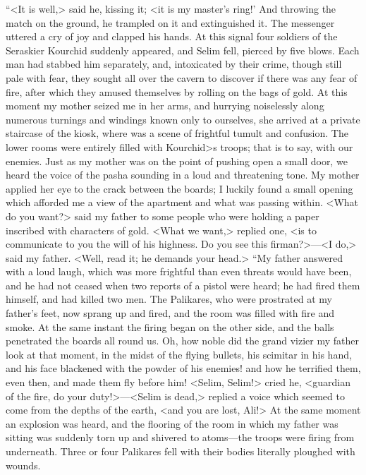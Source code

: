  “<It is well,> said he, kissing it; <it is my master's ring!' And throwing the match on the ground, he trampled on it and extinguished it. The messenger uttered a cry of joy and clapped his hands. At this signal four soldiers of the Seraskier Kourchid suddenly appeared, and Selim fell, pierced by five blows. Each man had stabbed him separately, and, intoxicated by their crime, though still pale with fear, they sought all over the cavern to discover if there was any fear of fire, after which they amused themselves by rolling on the bags of gold. At this moment my mother seized me in her arms, and hurrying noiselessly along numerous turnings and windings known only to ourselves, she arrived at a private staircase of the kiosk, where was a scene of frightful tumult and confusion. The lower rooms were entirely filled with Kourchid>s troops; that is to say, with our enemies. Just as my mother was on the point of pushing open a small door, we heard the voice of the pasha sounding in a loud and threatening tone. My mother applied her eye to the crack between the boards; I luckily found a small opening which afforded me a view of the apartment and what was passing within. <What do you want?> said my father to some people who were holding a paper inscribed with characters of gold. <What we want,> replied one, <is to communicate to you the will of his highness. Do you see this firman?>—<I do,> said my father. <Well, read it; he demands your head.>  “My father answered with a loud laugh, which was more frightful than even threats would have been, and he had not ceased when two reports of a pistol were heard; he had fired them himself, and had killed two men. The Palikares, who were prostrated at my father's feet, now sprang up and fired, and the room was filled with fire and smoke. At the same instant the firing began on the other side, and the balls penetrated the boards all round us. Oh, how noble did the grand vizier my father look at that moment, in the midst of the flying bullets, his scimitar in his hand, and his face blackened with the powder of his enemies! and how he terrified them, even then, and made them fly before him! <Selim, Selim!> cried he, <guardian of the fire, do your duty!>—<Selim is dead,> replied a voice which seemed to come from the depths of the earth, <and you are lost, Ali!> At the same moment an explosion was heard, and the flooring of the room in which my father was sitting was suddenly torn up and shivered to atoms—the troops were firing from underneath. Three or four Palikares fell with their bodies literally ploughed with wounds. 

